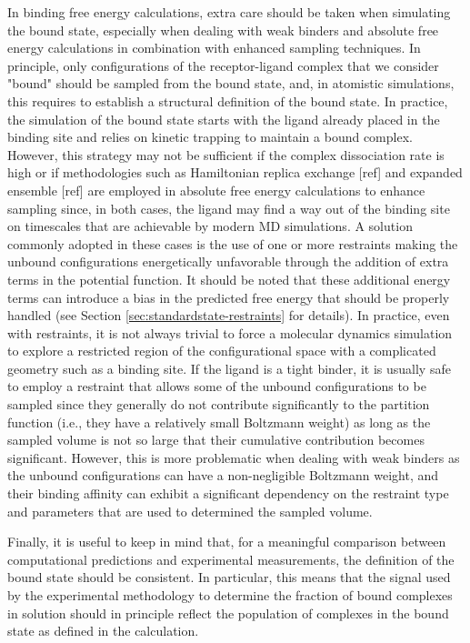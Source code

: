 \documentclass[9pt,bestpractices]{livecoms}
\begin{document}
In binding free energy calculations, extra care should be taken when simulating the bound state, especially when dealing with weak binders and absolute free energy calculations in combination with enhanced sampling techniques.
In principle, only configurations of the receptor-ligand complex that we consider "bound" should be sampled from the bound state, and, in atomistic simulations, this requires to establish a structural definition of the bound state.
In practice, the simulation of the bound state starts with the ligand already placed in the binding site and relies on kinetic trapping to maintain a bound complex.
However, this strategy may not be sufficient if the complex dissociation rate is high or if methodologies such as Hamiltonian replica exchange [ref] and expanded ensemble [ref] are employed in absolute free energy calculations to enhance sampling since, in both cases, the ligand may find a way out of the binding site on timescales that are achievable by modern MD simulations.
A solution commonly adopted in these cases is the use of one or more restraints making the unbound configurations energetically unfavorable through the addition of extra terms in the potential function.
It should be noted that these additional energy terms can introduce a bias in the predicted free energy that should be properly handled (see Section \ref{sec:standardstate-restraints} for details).
In practice, even with restraints, it is not always trivial to force a molecular dynamics simulation to explore a restricted region of the configurational space with a complicated geometry such as a binding site.
If the ligand is a tight binder, it is usually safe to employ a restraint that allows some of the unbound configurations to be sampled since they generally do not contribute significantly to the partition function (i.e., they have a relatively small Boltzmann weight) as long as the sampled volume is not so large that their cumulative contribution becomes significant.
However, this is more problematic when dealing with weak binders as the unbound configurations can have a non-negligible Boltzmann weight, and their binding affinity can exhibit a significant dependency on the restraint type and parameters that are used to determined the sampled volume.

Finally, it is useful to keep in mind that, for a meaningful comparison between computational predictions and experimental measurements, the definition of the bound state should be consistent.
In particular, this means that the signal used by the experimental methodology to determine the fraction of bound complexes in solution should in principle reflect the population of complexes in the bound state as defined in the calculation.
\end{document}
